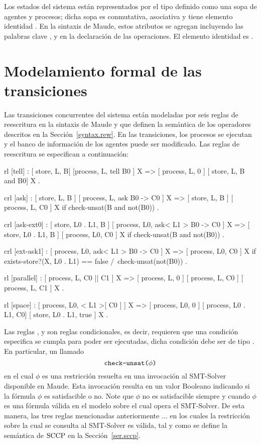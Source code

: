 Los estados del sistema est\'an representados por el tipo  definido como una sopa de agentes y procesos; dicha sopa es conmutativa, asociativa y tiene elemento identidad . En la sintaxis de Maude, estos atributos se agregan incluyendo las palabras clave ,  y  en la declaraci\'on de las operaciones. El elemento identidad es .

\section{Modelamiento formal de las transiciones}
\label{rules.rew}

Las transiciones concurrentes del sistema est\'an modeladas por seis reglas de reescritura en la sintaxis de Maude y que definen la sem\'antica de los operadores descritos en la Secci\'on~\ref{syntax.rew}. En las transiciones, los procesos se ejecutan y el banco de informaci\'on de los agentes puede ser modificado. Las reglas de reescritura se especifican a continuaci\'on: 

\begin{maude}
  rl [tell] :
     { [ store, L, B] [process, L, tell B0 ] X }
  => { [ process, L, 0 ] [ store, L, B and B0] X } .

 crl [ask] :
     { [ store, L, B ] [ process, L, ask B0  -> C0 ] X }
  => { [ store, L, B ] [ process, L, C0 ] X }
  if check-unsat(B and not(B0)) .

 crl [ask-ext0] :
     { [ store, L0 . L1, B ] 
       [ process, L0, ask< L1 > B0  -> C0 ] X }
  => { [ store, L0 . L1, B ] [ process, L0, C0 ] X }
  if check-unsat(B and not(B0)) . 

 crl [ext-ask1] :
     { [ process, L0, ask< L1 > B0  -> C0 ] X }
  => { [ process, L0, C0 ] X }
  if exists-store?(X, L0 . L1) == false
  /\ check-unsat(not(B0)) . 

  rl [parallel] :
     { [ process, L, C0 || C1 ] X }
  => { [ process, L, 0 ] [ process, L, C0 ] 
       [ process, L, C1 ] X } .

  rl [space] :
     { [ process, L0, < L1 >[ C0 ] ] X } 
  => { [ process, L0, 0 ] [ process, L0 . L1, C0] 
       [ store, L0 . L1, true ] X } .
\end{maude}

Las reglas \cde{[ask]},  y  son reglas condicionales, es decir, requieren que una condici\'on especifica se cumpla para poder ser ejecutadas, dicha condici\'on debe ser de tipo . En particular, un llamado \[\textnormal{\texttt{check-unsat(}}\phi\textnormal{\texttt{)}} \] en el cual $\phi$ es una restricci\'on resuelta en una invocaci\'on al SMT-Solver disponible en Maude. Esta invocaci\'on resulta en un valor Booleano indicando si la f\'ormula $\phi$ es satisfacible o no. Note que $\phi$ no es satisfacible siempre y cuando $\phi$ es una f\'ormula v\'alida en el modelo sobre el cual opera el SMT-Solver. De esta manera, las tres reglas mencionadas anteriormente ... en los cuales la restricci\'on sobre la cual se consulta al SMT-Solver es v\'alida, tal y como se define la sem\'antica de $\textnormal{SCCP}$ en la Secci\'on~\ref{ser.sccp}.

